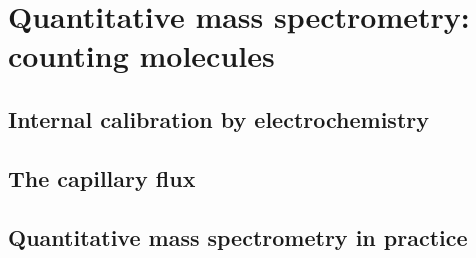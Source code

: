 

\section{Quantitative mass spectrometry: counting molecules}

\subsection{Internal calibration by electrochemistry}

\subsection{The capillary flux}

\subsection{Quantitative mass spectrometry in practice}

